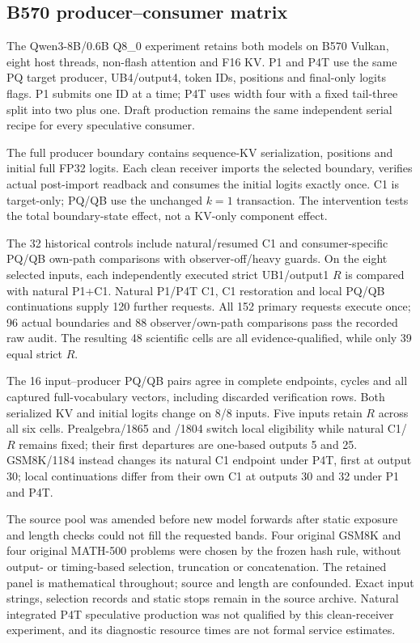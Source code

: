 \subsection{B570 producer--consumer matrix}
\label{supp:finalproducer}
The Qwen3-8B/0.6B Q8\_0 experiment retains both models on B570 Vulkan, eight host threads, non-flash attention and F16 KV. P1 and P4T use the same PQ target producer, UB4/output4, token IDs, positions and final-only logits flags. P1 submits one ID at a time; P4T uses width four with a fixed tail-three split into two plus one. Draft production remains the same independent serial recipe for every speculative consumer.

The full producer boundary contains sequence-KV serialization, positions and initial full FP32 logits. Each clean receiver imports the selected boundary, verifies actual post-import readback and consumes the initial logits exactly once. C1 is target-only; PQ/QB use the unchanged $k=1$ transaction. The intervention tests the total boundary-state effect, not a KV-only component effect.

The 32 historical controls include natural/resumed C1 and consumer-specific PQ/QB own-path comparisons with observer-off/heavy guards. On the eight selected inputs, each independently executed strict UB1/output1 $R$ is compared with natural P1+C1. Natural P1/P4T C1, C1 restoration and local PQ/QB continuations supply 120 further requests. All 152 primary requests execute once; 96 actual boundaries and 88 observer/own-path comparisons pass the recorded raw audit. The resulting 48 scientific cells are all evidence-qualified, while only 39 equal strict $R$.



The 16 input--producer PQ/QB pairs agree in complete endpoints, cycles and all captured full-vocabulary vectors, including discarded verification rows. Both serialized KV and initial logits change on 8/8 inputs. Five inputs retain $R$ across all six cells. Prealgebra/1865 and /1804 switch local eligibility while natural C1/$R$ remains fixed; their first departures are one-based outputs 5 and 25. GSM8K/1184 instead changes its natural C1 endpoint under P4T, first at output 30; local continuations differ from their own C1 at outputs 30 and 32 under P1 and P4T.

The source pool was amended before new model forwards after static exposure and length checks could not fill the requested bands. Four original GSM8K and four original MATH-500 problems were chosen by the frozen hash rule, without output- or timing-based selection, truncation or concatenation. The retained panel is mathematical throughout; source and length are confounded. Exact input strings, selection records and static stops remain in the source archive. Natural integrated P4T speculative production was not qualified by this clean-receiver experiment, and its diagnostic resource times are not formal service estimates.

